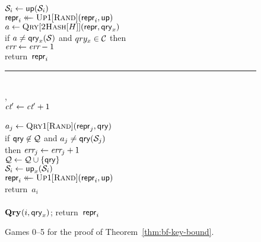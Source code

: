 \begin{figure}
{      $\mathcal{S}_i \gets \mathsf{up}(\mathcal{S}_i)$\\
      $\mathsf{repr}_i \mathrel{\leftarrow\mkern-14mu\leftarrow} \textsc{Up}1[\textsc{Rand}](\mathsf{repr}_i,\mathsf{up})$\\
      $a \gets \textsc{Qry}[\textsc{2Hash}[H]](\mathsf{repr}, \mathsf{qry}_x)$\\
      if $a \neq \mathsf{qry}_x(\mathcal{S})$ and $qry_x \in \mathcal{C}$ then\\
      \tab $\textit{err} \gets \textit{err}-1$\\
      return~$\mathsf{repr}_i$
    \\[3pt]
    \hspace*{-4pt}\rule{1.049\textwidth}{.4pt}
    \\[2pt]
    ,\hfill{}\hspace*{0pt}\\[2pt]
      $\textit{ct}' \gets \textit{ct}' + 1$\\
      \\
      \tab $a_j \gets \textsc{Qry}1[\textsc{Rand}](\mathsf{repr}_j, \mathsf{qry})$\\
      \tab if  $\mathsf{qry}\not\in\mathcal{Q}$ and $a_j \ne \mathsf{qry}(\mathcal{S}_j)$\\
      \tab\tab then $\textit{err}_j \gets \textit{err}_j + 1$\\
       $\mathcal{Q} \gets \mathcal{Q} \cup \{\mathsf{qry}\}$\\
      $\mathcal{S}_i \gets \mathsf{up}_x(\mathcal{S}_i)$\\
      $\mathsf{repr}_i \mathrel{\leftarrow\mkern-14mu\leftarrow} \textsc{Up}1[\textsc{Rand}](\mathsf{repr}_i,\mathsf{up})$\\
      return~$a_i$
    \\[2pt]
    \\[2pt]
      $\mathbf{Qry}\hspace{0.5pt}(i, \mathsf{qry}_x)$; return~$\mathsf{repr}_i$\\
  }
  \caption{Games 0--5 for the proof of
  Theorem~\ref{thm:bf-key-bound}.}
  \label{fig:bf-prf-correct}
\end{figure}

